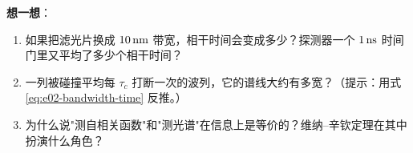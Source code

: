 \noindent\textbf{想一想}：
\begin{enumerate}
  \item 如果把滤光片换成 \(10\,{\rm nm}\) 带宽，相干时间会变成多少？探测器一个 \(1\,{\rm ns}\) 时间门里又平均了多少个相干时间？
  \item 一列被碰撞平均每 \(\tau_c\) 打断一次的波列，它的谱线大约有多宽？（提示：用式 \eqref{eq:e02-bandwidth-time} 反推。）
  \item 为什么说"测自相关函数"和"测光谱"在信息上是等价的？维纳–辛钦定理在其中扮演什么角色？
\end{enumerate}
